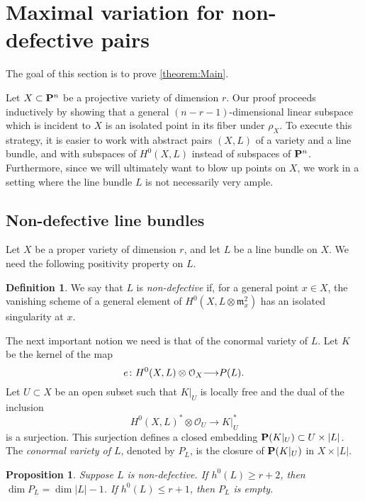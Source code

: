 \documentclass[11pt,reqno]{amsart}
\theoremstyle{plain}
\newtheorem{proposition}[theorem]{Proposition}
\theoremstyle{definition}
\newtheorem{definition}[theorem]{Definition}
\theoremstyle{remark}
\numberwithin{equation}{section}
\renewcommand{\to}{{\longrightarrow}}
\numberwithin{equation}{section}
\renewcommand{\O}{\mathcal O}
\begin{document}
\section{Maximal variation for non-defective pairs}
\label{sec:proof_of_theorem:main}
The goal of this section is to prove \autoref{theorem:Main}.

Let $X \subset \P^n$ be a projective variety of dimension $r$.
Our proof proceeds inductively by showing that a general $(n-r-1)$-dimensional linear subspace which is incident to $X$ is an isolated point in its fiber under $\rho_X$.
To execute this strategy, it is easier to work with abstract pairs $(X, L)$ of a variety and a line bundle, and with subspaces of $H^0(X, L)$ instead of subspaces of $\P^n$.
Furthermore, since we will ultimately want to blow up points on $X$, we work in a setting where the line bundle $L$ is not necessarily very ample.

\subsection{Non-defective line bundles}
Let $X$ be a proper variety of dimension $r$, and let $L$ be a line bundle on $X$.
We need the following positivity property on $L$.
\begin{definition}
  \label{definition:Genericallynon-defective} 
  We say that $L$ is \emph{non-defective} if, for a general point $x \in X$, the vanishing scheme of a general element of $H^{0}(X, L \otimes {\mathfrak m}^{2}_{x} )$ has an isolated singularity at $x$.
\end{definition} 

The next important notion we need is that of the conormal variety of $L$.
Let $K$ be the kernel of the map
\[ e \from H^0(X, L) \otimes \O_X \to P(L).\]
Let $U \subset X$ be an open subset such that $K|_U$ is locally free and the dual of the inclusion 
\[H^0(X, L)^* \otimes \O_U \to K|_U^*\]
is a surjection.
This surjection defines a closed embedding $\P(K|_U) \subset U \times |L|$.
The \emph{conormal variety of $L$}, denoted by $P_L$, is the closure of $\P(K|_U)$ in $X \times |L|$.

\begin{proposition}\label{prop:dimension}
  \label{prop:dimP}
  Suppose $L$ is non-defective.
  If $h^0(L) \geq r+2$, then $\dim P_L = \dim |L| - 1$.
  If $h^0(L) \leq r+1$, then $P_L$ is empty.
\end{proposition} 
\end{document}
